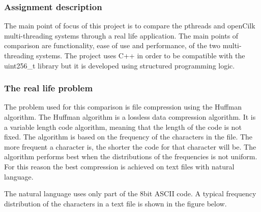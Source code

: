 \subsubsection{Assignment description}
The main point of focus of this project is to compare the pthreads and openCilk multi-threading systems through a real life application.
The main points of comparison are functionality, ease of use and performance, of the two multi-threading systems. The project uses C++ in
order to be compatible with the uint256\_t library but it is developed using structured programming logic.

\subsubsection{The real life problem}
The problem used for this comparison is file compression using the Huffman algorithm. The Huffman algorithm is a lossless data compression algorithm. 
It is a variable length code algorithm, meaning that the length of the code is not fixed. The algorithm is based on the frequency of the characters in
the file. The more frequent a character is, the shorter the code for that character will be. The algorithm performs best when the distributions of the 
frequencies is not uniform. For this reason the best compression is achieved on text files with natural language. 

The natural language uses only part of the 8bit ASCII code. A typical frequency distribution of the characters in a text file is shown in the figure below.

